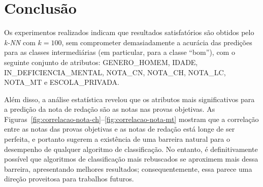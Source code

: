 \documentclass[12pt]{article}
\begin{document}
\section{Conclusão}
\label{sec:conclusao}
Os experimentos realizados indicam que resultados satisfatórios são obtidos pelo \emph{k-NN} com $k=100$, sem comprometer demasiadamente a acurácia das predições para as classes intermediárias (em particular, para a classe ``bom''), com o seguinte conjunto de atributos: GENERO\_HOMEM, IDADE, IN\_DEFICIENCIA\_MENTAL, NOTA\_CN, NOTA\_CH, NOTA\_LC, NOTA\_MT e ESCOLA\_PRIVADA.

Além disso, a análise estatística revelou que os atributos mais significativos para a predição da nota de redação são as notas nas provas objetivas.
As Figuras~\ref{fig:correlacao-nota-ch}--\ref{fig:correlacao-nota-mt} mostram que a correlação entre as notas das provas objetivas e as notas de redação está longe de ser perfeita, e portanto sugerem a existência de uma barreira natural para o desempenho de qualquer algoritmo de classificação.
No entanto, é definitivamente possível que algoritmos de classificação mais rebuscados se aproximem mais dessa barreira, apresentando melhores resultados; consequentemente, essa parece uma direção proveitosa para trabalhos futuros.
\end{document}
